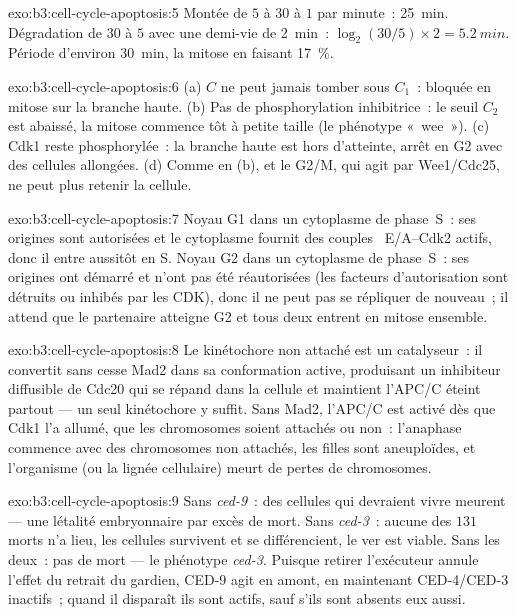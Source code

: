 \begin{solution}{exo:b3:cell-cycle-apoptosis:5}
Montée de $5$ à $30$ à $1$ par minute~: \qty{25}{min}. Dégradation de
$30$ à $5$ avec une demi-vie de \qty{2}{min}~: $\log_{2}(30/5)\times 2 =
\qty{5.2}{min}$. Période d'environ \qty{30}{min}, la mitose en faisant
\qty{17}{\%}.
\end{solution}

\begin{solution}{exo:b3:cell-cycle-apoptosis:6}
(a) $C$ ne peut jamais tomber sous $C_{1}$~: bloquée en mitose sur la
branche haute. (b) Pas de phosphorylation inhibitrice~: le seuil
$C_{2}$ est abaissé, la mitose commence tôt à petite taille (le
phénotype «~wee~»). (c) Cdk1 reste phosphorylée~: la branche haute est
hors d'atteinte, arrêt en G2 avec des cellules allongées. (d) Comme en
(b), et le  G2/M, qui agit par Wee1/Cdc25, ne peut
plus retenir la cellule.
\end{solution}

\begin{solution}{exo:b3:cell-cycle-apoptosis:7}
Noyau G1 dans un cytoplasme de phase~S~: ses origines sont autorisées
et le cytoplasme fournit des couples ~E/A--Cdk2 actifs, donc il
entre aussitôt en S. Noyau G2 dans un cytoplasme de phase~S~: ses
origines ont démarré et n'ont pas été réautorisées (les facteurs
d'autorisation sont détruits ou inhibés par les CDK), donc il ne peut
pas se répliquer de nouveau~; il attend que le partenaire atteigne G2
et tous deux entrent en mitose ensemble.
\end{solution}

\begin{solution}{exo:b3:cell-cycle-apoptosis:8}
Le kinétochore non attaché est un catalyseur~: il convertit sans cesse
Mad2 dans sa conformation active, produisant un inhibiteur diffusible
de Cdc20 qui se répand dans la cellule et maintient l'APC/C éteint
partout --- un seul kinétochore y suffit. Sans Mad2, l'APC/C est
activé dès que Cdk1 l'a allumé, que les chromosomes soient attachés ou
non~: l'anaphase commence avec des chromosomes non attachés, les filles
sont aneuploïdes, et l'organisme (ou la lignée cellulaire) meurt de
pertes de chromosomes.
\end{solution}

\begin{solution}{exo:b3:cell-cycle-apoptosis:9}
Sans \emph{ced-9}~: des cellules qui devraient vivre meurent --- une
létalité embryonnaire par excès de mort. Sans \emph{ced-3}~: aucune des
$131$ morts n'a lieu, les cellules survivent et se différencient, le
ver est viable. Sans les deux~: pas de mort --- le phénotype
\emph{ced-3}. Puisque retirer l'exécuteur annule l'effet du retrait du
gardien, CED-9 agit en amont, en maintenant CED-4/CED-3 inactifs~;
quand il disparaît ils sont actifs, sauf s'ils sont absents eux aussi.
\end{solution}

